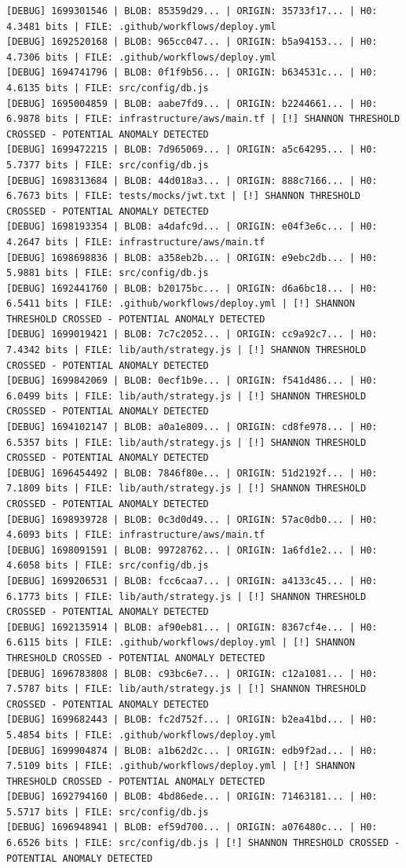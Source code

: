 \documentclass[12pt, a4paper, oneside]{report}
\begin{document}
\begin{lstlisting}[basicstyle=\tiny\ttfamily]
[DEBUG] 1699301546 | BLOB: 85359d29... | ORIGIN: 35733f17... | H0: 4.3481 bits | FILE: .github/workflows/deploy.yml
[DEBUG] 1692520168 | BLOB: 965cc047... | ORIGIN: b5a94153... | H0: 4.7306 bits | FILE: .github/workflows/deploy.yml
[DEBUG] 1694741796 | BLOB: 0f1f9b56... | ORIGIN: b634531c... | H0: 4.6135 bits | FILE: src/config/db.js
[DEBUG] 1695004859 | BLOB: aabe7fd9... | ORIGIN: b2244661... | H0: 6.9878 bits | FILE: infrastructure/aws/main.tf | [!] SHANNON THRESHOLD CROSSED - POTENTIAL ANOMALY DETECTED
[DEBUG] 1699472215 | BLOB: 7d965069... | ORIGIN: a5c64295... | H0: 5.7377 bits | FILE: src/config/db.js
[DEBUG] 1698313684 | BLOB: 44d018a3... | ORIGIN: 888c7166... | H0: 6.7673 bits | FILE: tests/mocks/jwt.txt | [!] SHANNON THRESHOLD CROSSED - POTENTIAL ANOMALY DETECTED
[DEBUG] 1698193354 | BLOB: a4dafc9d... | ORIGIN: e04f3e6c... | H0: 4.2647 bits | FILE: infrastructure/aws/main.tf
[DEBUG] 1698698836 | BLOB: a358eb2b... | ORIGIN: e9ebc2db... | H0: 5.9881 bits | FILE: src/config/db.js
[DEBUG] 1692441760 | BLOB: b20175bc... | ORIGIN: d6a6bc18... | H0: 6.5411 bits | FILE: .github/workflows/deploy.yml | [!] SHANNON THRESHOLD CROSSED - POTENTIAL ANOMALY DETECTED
[DEBUG] 1699019421 | BLOB: 7c7c2052... | ORIGIN: cc9a92c7... | H0: 7.4342 bits | FILE: lib/auth/strategy.js | [!] SHANNON THRESHOLD CROSSED - POTENTIAL ANOMALY DETECTED
[DEBUG] 1699842069 | BLOB: 0ecf1b9e... | ORIGIN: f541d486... | H0: 6.0499 bits | FILE: lib/auth/strategy.js | [!] SHANNON THRESHOLD CROSSED - POTENTIAL ANOMALY DETECTED
[DEBUG] 1694102147 | BLOB: a0a1e809... | ORIGIN: cd8fe978... | H0: 6.5357 bits | FILE: lib/auth/strategy.js | [!] SHANNON THRESHOLD CROSSED - POTENTIAL ANOMALY DETECTED
[DEBUG] 1696454492 | BLOB: 7846f80e... | ORIGIN: 51d2192f... | H0: 7.1809 bits | FILE: lib/auth/strategy.js | [!] SHANNON THRESHOLD CROSSED - POTENTIAL ANOMALY DETECTED
[DEBUG] 1698939728 | BLOB: 0c3d0d49... | ORIGIN: 57ac0db0... | H0: 4.6093 bits | FILE: infrastructure/aws/main.tf
[DEBUG] 1698091591 | BLOB: 99728762... | ORIGIN: 1a6fd1e2... | H0: 4.6058 bits | FILE: src/config/db.js
[DEBUG] 1699206531 | BLOB: fcc6caa7... | ORIGIN: a4133c45... | H0: 6.1773 bits | FILE: lib/auth/strategy.js | [!] SHANNON THRESHOLD CROSSED - POTENTIAL ANOMALY DETECTED
[DEBUG] 1692135914 | BLOB: af90eb81... | ORIGIN: 8367cf4e... | H0: 6.6115 bits | FILE: .github/workflows/deploy.yml | [!] SHANNON THRESHOLD CROSSED - POTENTIAL ANOMALY DETECTED
[DEBUG] 1696783808 | BLOB: c93bc6e7... | ORIGIN: c12a1081... | H0: 7.5787 bits | FILE: lib/auth/strategy.js | [!] SHANNON THRESHOLD CROSSED - POTENTIAL ANOMALY DETECTED
[DEBUG] 1699682443 | BLOB: fc2d752f... | ORIGIN: b2ea41bd... | H0: 5.4854 bits | FILE: .github/workflows/deploy.yml
[DEBUG] 1699904874 | BLOB: a1b62d2c... | ORIGIN: edb9f2ad... | H0: 7.5109 bits | FILE: .github/workflows/deploy.yml | [!] SHANNON THRESHOLD CROSSED - POTENTIAL ANOMALY DETECTED
[DEBUG] 1692794160 | BLOB: 4bd86ede... | ORIGIN: 71463181... | H0: 5.5717 bits | FILE: src/config/db.js
[DEBUG] 1696948941 | BLOB: ef59d700... | ORIGIN: a076480c... | H0: 6.6526 bits | FILE: src/config/db.js | [!] SHANNON THRESHOLD CROSSED - POTENTIAL ANOMALY DETECTED
\end{lstlisting}
\end{document}
